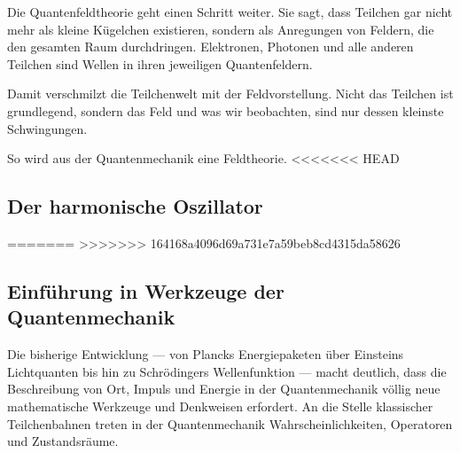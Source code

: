 	Die Quantenfeldtheorie geht einen Schritt weiter.
	Sie sagt, dass Teilchen gar nicht mehr als kleine Kügelchen existieren, sondern als Anregungen von Feldern, die den gesamten Raum durchdringen. 
	Elektronen, Photonen und alle anderen Teilchen sind Wellen in ihren jeweiligen Quantenfeldern.
	
	Damit verschmilzt die Teilchenwelt mit der Feldvorstellung.
	Nicht das Teilchen ist grundlegend, sondern das Feld und was wir beobachten, sind nur dessen kleinste Schwingungen.
	
	So wird aus der Quantenmechanik eine Feldtheorie.
<<<<<<< HEAD
	
	
	
	
	
	
	
	
	
	
	
	
	
	
	
	
\subsection{Der harmonische Oszillator\label{fourier:subsection:derHarmonischeOszillator}}
=======
>>>>>>> 164168a4096d69a731e7a59beb8cd4315da58626

\subsection{Einführung in Werkzeuge der Quantenmechanik\label{fourier:subsection:werkzeugeQuantenmechanik}}
	Die bisherige Entwicklung --- von Plancks Energiepaketen über Einsteins Lichtquanten bis hin zu Schrödingers Wellenfunktion ---
	macht deutlich, dass die Beschreibung von Ort, Impuls und Energie in der Quantenmechanik völlig neue mathematische Werkzeuge und Denkweisen erfordert.
	An die Stelle klassischer Teilchenbahnen treten in der Quantenmechanik Wahrscheinlichkeiten, Operatoren und Zustandsräume.

